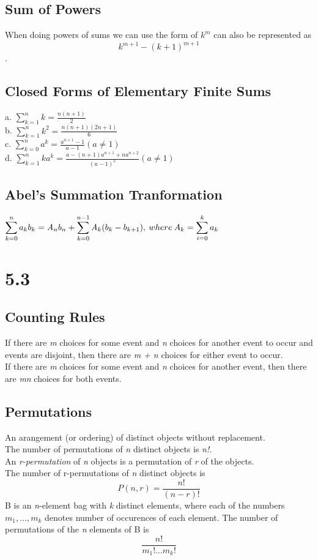 \documentclass[10pt,twocolumn]{article}
\begin{document}
	\subsection*{Sum of Powers}
	When doing powers of sums we can use the form of $k^m$ can also be
	represented as \[k^{m+1} - ( k + 1)^{m+1}\].

	\subsection*{Closed Forms of Elementary Finite Sums}
	a. $\displaystyle\sum_{k=1}^n k = \frac{n(n+1)}{2}$\\
	b. $\displaystyle\sum_{k=1}^n k^2 = \frac{n(n+1)(2n+1)}{6}$\\
	c. $\displaystyle\sum_{k=0}^n a^k = \frac{a^{n+1} - 1}{a -1} ( a \neq
	1)$\\
	d. $\displaystyle\sum_{k=1}^n ka^k = \frac{a - (n + 1)a^{n+1} +
	  na^{n+2}}{(a-1)^2} (a \neq 1)$\\

	\subsection*{Abel's Summation Tranformation}
	$\displaystyle\sum_{k=0}^n a_kb_k = \mathit{A}_nb_n + \sum_{k=0}^{n-1}
	\mathit{A}_k(b_k - b_{k+1}),\\
	  \:where\:A_k = \sum_{i=0}^k a_k$

	\section*{5.3}
	
	\subsection*{Counting Rules}
	If there are \textit{m} choices for some event and \textit{n} choices for another event to occur and events are disjoint, then there are \textit{m + n} choices for either event to occur. \\
	If there are \textit{m} choices for some event and \textit{n} choices for another event, then there are \textit{mn} choices for both events.
	\subsection*{Permutations}
	An arangement (or ordering) of distinct objects without replacement. \\
	The number of permutations of \textit{n} distinct objects is \textit{n!}. \\
	An \textit{r-permutation} of \textit{n} objects is a permutation of \textit{r} of the objects. \\
	The number of r-permutations of \textit{n} distinct objects is
	\[P(n, r)=\frac{n!}{(n - r)!}\]
	B is an \textit{n}-element bag with \textit{k} distinct elements, where each of the numbers $m_1,\ldots,m_k$ denotes number of occurences of each element.  The number of permutations of the \textit{n} elements of B is \[\frac{n!}{m_1! \ldots m_k!}\]
\end{document}
